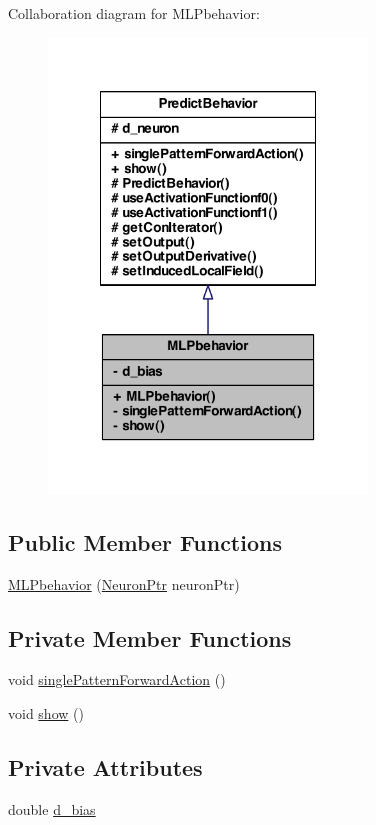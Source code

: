Collaboration diagram for MLPbehavior:
\nopagebreak
\begin{figure}[H]
\begin{center}
\leavevmode
\includegraphics[width=240pt]{class_m_l_pbehavior__coll__graph}
\end{center}
\end{figure}
\subsection*{Public Member Functions}
\begin{DoxyCompactItemize}
\item 
\hyperlink{class_m_l_pbehavior_a6e42077295843dd0d9e52f2776f4309e}{MLPbehavior} (\hyperlink{_a_m_o_r_e_8h_ac1ea936c2c7728eb382278131652fef4}{NeuronPtr} neuronPtr)
\end{DoxyCompactItemize}
\subsection*{Private Member Functions}
\begin{DoxyCompactItemize}
\item 
void \hyperlink{class_m_l_pbehavior_a2f91bc3f2e558b92f5beb5e45402e6c7}{singlePatternForwardAction} ()
\item 
void \hyperlink{class_m_l_pbehavior_a32aa885e07e8f4eb33e05afb46040567}{show} ()
\end{DoxyCompactItemize}
\subsection*{Private Attributes}
\begin{DoxyCompactItemize}
\item 
double \hyperlink{class_m_l_pbehavior_a6206785c5c3f838a0538f9f77fa7a25a}{d\_\-bias}
\end{DoxyCompactItemize}
